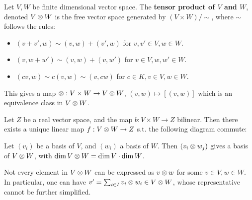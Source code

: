 \documentclass{article}
\begin{document}
\begin{definition}
    Let $V, W$ be finite dimensional vector space. The \textbf{tensor product of $V$ and $W$}, denoted $V \otimes W$ is the free vector space generated by $(V \times W)/ \sim$, where $\sim$ follows the rules:
    \begin{itemize}
        \item $(v + v', w) \sim (v, w) + (v', w)$ for $v, v' \in V, w \in W$.
        \item $(v, w + w') \sim (v, w) + (v, w')$ for $v \in V, w, w' \in W$.
        \item $(cv, w) \sim c(v, w) \sim (v, cw)$ for $c \in K, v \in V, w \in W$.
    \end{itemize}
    This gives a map $\otimes: V \times W \to V \otimes W$, $(v, w) \mapsto [(v, w)]$ which is an equivalence class in $V \otimes W$.
\end{definition}

\begin{proposition}
    Let $Z$ be a real vector space, and the map $b: V \times W \to Z$ bilinear. Then there exists a unique linear map $f: V \otimes W \to Z$ s.t. the following diagram commute:

    \begin{minipage}{\linewidth}
        \centering
    \end{minipage}
\end{proposition}

\begin{corollary}
    Let $(v_i)$ be a basis of $V$, and $(w_i)$ a basis of $W$. Then $(v_i \otimes w_j)$ gives a basis of $V \otimes W$, with $\dim V \otimes W = \dim V \cdot \dim W$.
\end{corollary}

\begin{remark}
    Not every element in $V \otimes W$ can be expressed as $v \otimes w$ for some $v \in V, w \in W$. In particular, one can have $v' = \sum_{i \in I} v_i \otimes w_i \in V \otimes W$, whose representative cannot be further simplified. 
\end{remark}
\end{document}
